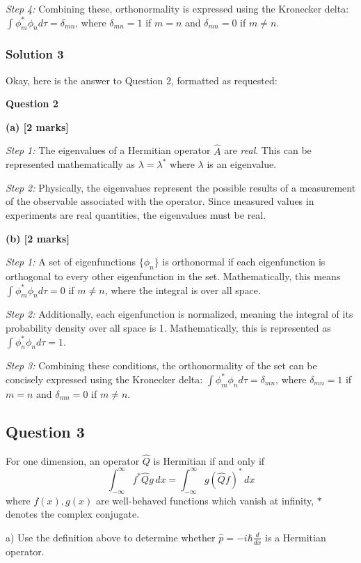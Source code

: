 \documentclass{article}
\begin{document}
\textit{Step 4:} Combining these, orthonormality is expressed using the Kronecker delta: $\int \phi_m^* \phi_n d\tau = \delta_{mn}$, where $\delta_{mn} = 1$ if $m = n$ and $\delta_{mn} = 0$ if $m \neq n$.


\subsubsection{Solution 3}
Okay, here is the answer to Question 2, formatted as requested:

\textbf{Question 2}

\textbf{(a) [2 marks]}

\textit{Step 1:} The eigenvalues of a Hermitian operator $\hat{A}$ are \textit{real}. This can be represented mathematically as $\lambda = \lambda^*$ where $\lambda$ is an eigenvalue.

\textit{Step 2:} Physically, the eigenvalues represent the possible results of a measurement of the observable associated with the operator. Since measured values in experiments are real quantities, the eigenvalues must be real.

\textbf{(b) [2 marks]}

\textit{Step 1:} A set of eigenfunctions $\{\phi_n\}$ is orthonormal if each eigenfunction is orthogonal to every other eigenfunction in the set. Mathematically, this means $\int \phi_m^* \phi_n d\tau = 0$ if $m \neq n$, where the integral is over all space.

\textit{Step 2:} Additionally, each eigenfunction is normalized, meaning the integral of its probability density over all space is 1. Mathematically, this is represented as $\int \phi_n^* \phi_n d\tau = 1$.

\textit{Step 3:} Combining these conditions, the orthonormality of the set can be concisely expressed using the Kronecker delta: $\int \phi_m^* \phi_n d\tau = \delta_{mn}$, where $\delta_{mn} = 1$ if $m = n$ and $\delta_{mn} = 0$ if $m \neq n$.


\subsection{Question 3} 

For one dimension, an operator $\hat{Q}$ is Hermitian if and only if
\[
\int_{-\infty}^{\infty} f^* \hat{Q} g \, dx = \int_{-\infty}^{\infty} g (\hat{Q} f)^* \, dx
\]
where $f(x), g(x)$ are well-behaved functions which vanish at infinity, $*$ denotes the complex conjugate.

a) Use the definition above to determine whether $\hat{p} = -i\hbar \frac{d}{dx}$ is a Hermitian operator.
\end{document}
